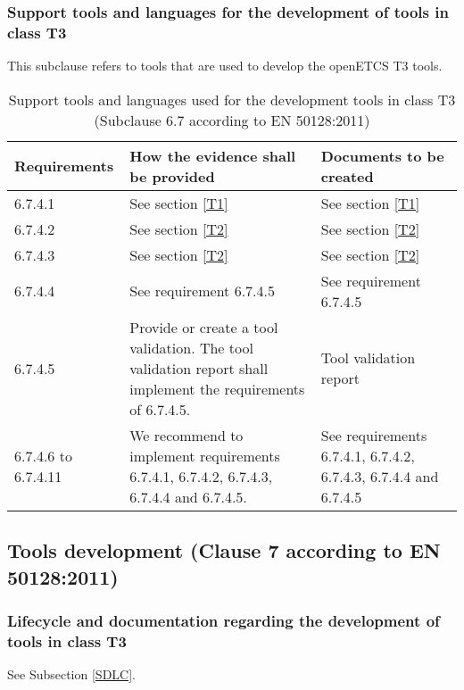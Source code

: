 \documentclass{template/openetcs_report}
\begin{document}
\subsubsection{Support tools and languages for the development of tools in class T3}
\begin{flushleft}
This subclause refers to tools that are used to develop the openETCS T3 tools.
\end{flushleft}
{\footnotesize\sffamily\centering
\begin{longtable}{|p{2cm}|p{9cm}|p{3cm}|}
\caption{Support tools and languages used for the development tools in class T3 (Subclause 6.7 according to EN 50128:2011)}\\
\hline
\bfseries Requirements & \bfseries How the evidence shall be provided & \bfseries Documents to be created\\
\hline
\hline
\endhead
\hline
\endfoot

6.7.4.1 & See section \ref{T1} & See section \ref{T1}\\ 
\hline
6.7.4.2 & See section \ref{T2} & See section \ref{T2}\\ 
\hline
6.7.4.3 & See section \ref{T2} & See section \ref{T2}\\  
\hline
6.7.4.4 & See requirement 6.7.4.5 & See requirement 6.7.4.5\\  
\hline
6.7.4.5 & Provide or create a tool validation.
The tool validation report shall implement the requirements of 6.7.4.5.
& Tool validation report\\  
\hline
6.7.4.6 to 6.7.4.11 & We recommend to implement requirements 6.7.4.1, 6.7.4.2, 6.7.4.3, 6.7.4.4 and 6.7.4.5.
& See requirements 6.7.4.1, 6.7.4.2, 6.7.4.3, 6.7.4.4 and 6.7.4.5\\  
\hline
\end{longtable}}


\subsection{Tools development (Clause 7 according to EN 50128:2011)}
\label{clause7}
\subsubsection{Lifecycle and documentation regarding the development of tools in class T3}
See Subsection \ref{SDLC}.
\end{document}
